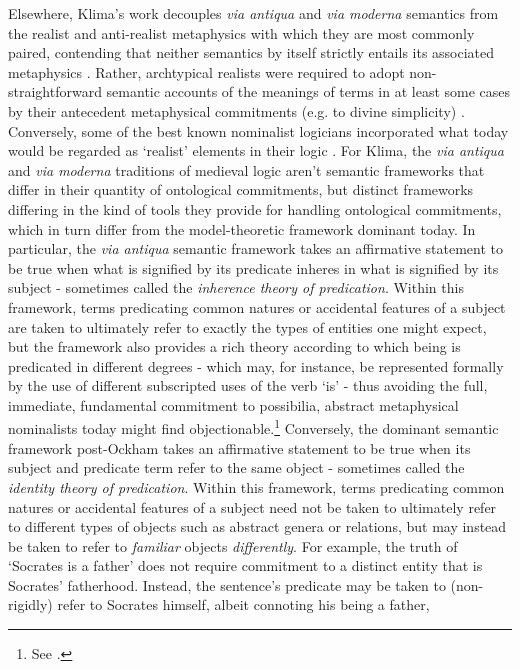 \documentclass[]{article}
\begin{document}
Elsewhere, Klima's work decouples \emph{via antiqua} and \emph{via moderna} semantics 
from the realist and anti-realist metaphysics with which they are most commonly paired,
contending that neither semantics by itself strictly entails its associated metaphysics \autocite{Klima1999,Klima2011}. 
Rather, archtypical realists were required to adopt non-straightforward semantic accounts of the meanings of terms in at least some cases by their antecedent metaphysical commitments (e.g. to divine simplicity) \autocite{Klima2002b}.
Conversely, some of the best known nominalist logicians incorporated what today would be regarded as `realist' elements in their logic \autocite{Klima2005}. 
For Klima, the \emph{via antiqua} and \emph{via moderna} traditions of medieval logic aren't semantic frameworks that differ in their quantity of ontological commitments, 
but distinct frameworks differing in the kind of tools they provide for handling ontological commitments, 
which in turn differ from the model-theoretic framework dominant today. 
In particular, the \emph{via antiqua} semantic framework takes an affirmative statement to be true when what is signified by its predicate inheres in what is signified by its subject - sometimes called the \emph{inherence theory of predication}.
Within this framework, terms predicating common natures or accidental features of a subject are taken to ultimately refer to exactly the types of entities one might expect, 
but the framework also provides a rich theory according to which being is predicated in different degrees - 
which may, for instance, be represented formally by the use of different subscripted uses of the verb `is' - 
thus avoiding the full, immediate, fundamental commitment to possibilia, abstract metaphysical nominalists today might find objectionable.\footnote{See \autocite{Klima2002}.}
Conversely, the dominant semantic framework post-Ockham takes an affirmative statement to be true when its subject and predicate term refer to the same object 
- sometimes called the \emph{identity theory of predication}. 
Within this framework, terms predicating common natures or accidental features of a subject need not be taken to ultimately refer to different types of objects such as abstract genera or relations, 
but may instead be taken to refer to \emph{familiar} objects \emph{differently}. 
For example, the truth of `Socrates is a father' does not require commitment to a distinct entity that is Socrates' fatherhood.
Instead, the sentence's predicate may be taken to (non-rigidly) refer to Socrates himself, albeit connoting his being a father, 
\end{document}
